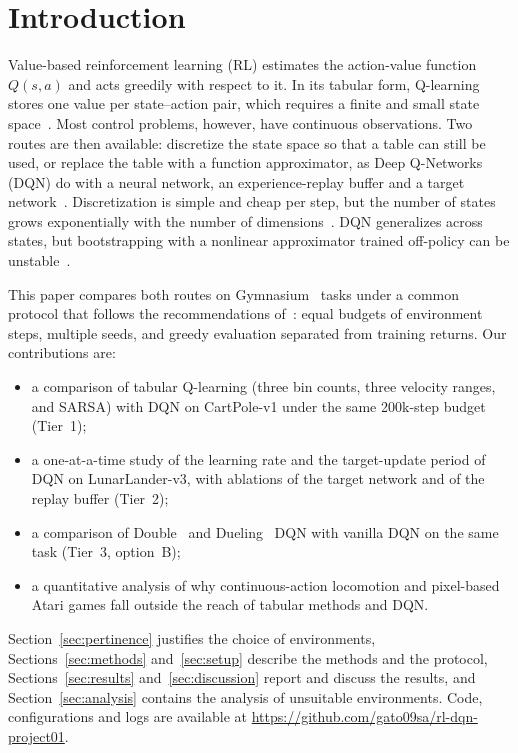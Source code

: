 \documentclass[conference]{IEEEtran}
\begin{document}
\section{Introduction}

Value-based reinforcement learning (RL) estimates the action-value function $Q(s,a)$ and
acts greedily with respect to it. In its tabular form, Q-learning~\cite{watkins1992} stores
one value per state--action pair, which requires a finite and small state
space~\cite{sutton2018}. Most control problems, however, have continuous observations.
Two routes are then available: discretize the state space so that a table can still be
used, or replace the table with a function approximator, as Deep Q-Networks (DQN) do with a
neural network, an experience-replay buffer and a target network~\cite{mnih2015}.
Discretization is simple and cheap per step, but the number of states grows exponentially
with the number of dimensions~\cite{bellman1957}. DQN generalizes across states, but
bootstrapping with a nonlinear approximator trained off-policy can be
unstable~\cite{sutton2018}.

This paper compares both routes on Gymnasium~\cite{towers2024} tasks under a common
protocol that follows the recommendations of~\cite{henderson2018}: equal budgets of
environment steps, multiple seeds, and greedy evaluation separated from training returns.
Our contributions are:
\begin{itemize}
  \item a comparison of tabular Q-learning (three bin counts, three velocity ranges, and
        SARSA) with DQN on CartPole-v1 under the same 200k-step budget (Tier~1);
  \item a one-at-a-time study of the learning rate and the target-update period of DQN on
        LunarLander-v3, with ablations of the target network and of the replay buffer
        (Tier~2);
  \item a comparison of Double~\cite{vanhasselt2016} and Dueling~\cite{wang2016} DQN with
        vanilla DQN on the same task (Tier~3, option~B);
  \item a quantitative analysis of why continuous-action locomotion and pixel-based Atari
        games fall outside the reach of tabular methods and DQN.
\end{itemize}
Section~\ref{sec:pertinence} justifies the choice of environments,
Sections~\ref{sec:methods} and~\ref{sec:setup} describe the methods and the protocol,
Sections~\ref{sec:results} and~\ref{sec:discussion} report and discuss the results, and
Section~\ref{sec:analysis} contains the analysis of unsuitable environments. Code,
configurations and logs are available at
\url{https://github.com/gato09sa/rl-dqn-project01}.
\end{document}

